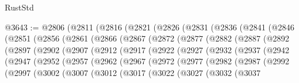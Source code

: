 \begin{lexlean}{RustStd}
\begin{coremodule}
@3643 := @2806
    (@2811
      (@2816
        (@2821
          (@2826
            (@2831
              (@2836
                (@2841
                  (@2846
                    (@2851
                      (@2856
                        (@2861
                          (@2866
                            (@2867
                              (@2872
                                (@2877
                                  (@2882
                                    (@2887
                                      (@2892
                                        (@2897
                                          (@2902
                                            (@2907
                                              (@2912
                                                (@2917
                                                  (@2922
                                                    (@2927
                                                      (@2932
                                                        (@2937
                                                          (@2942
                                                            (@2947
                                                              (@2952
                                                                (@2957
                                                                  (@2962
                                                                    (@2967
                                                                      (@2972
                                                                        (@2977
                                                                          (@2982
                                                                            (@2987
                                                                              (@2992
                                                                                (@2997
                                                                                  (@3002
                                                                                    (@3007
                                                                                      (@3012
                                                                                        (@3017
                                                                                          (@3022
                                                                                            (@3027
                                                                                              (@3032
                                                                                                (@3037

\end{coremodule}
\end{lexlean}
